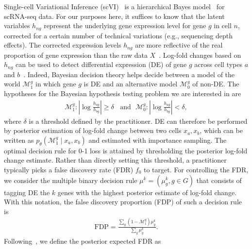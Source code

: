 Single-cell Variational Inference (scVI)~\cite{Lopez292037} is a hierarchical Bayes model~\cite{GelmanHill:2007} for scRNA-seq data. For our purposes here, it suffices to know that the latent variables $h_{ng}$ represent the underlying gene expression level for gene $g$ in cell $n$, corrected for a certain number of technical variations (e.g., sequencing depth effects). The corrected expression levels $h_{ng}$ are more reflective of the real proportion of gene expression than the raw data $X$~\cite{Cole2017}. Log-fold changes based on $h_{ng}$ can be used to detect differential expression (DE) of gene $g$ across cell types $a$ and $b$~\cite{deseq2,Boyeau794289}. Indeed, Bayesian decision theory helps decide between a model of the world $\mathcal{M}_1^g$ in which gene $g$ is DE and an alternative model $\mathcal{M}_0^g$ of non-DE. The hypotheses for the Bayesian hypothesis testing problem we are interested in are
\begin{align}
    \mathcal{M}^g_1: \left|\log\frac{h_{ag}}{h_{bg}}\right| \geq \delta ~~~~ \text{and}~~~ \mathcal{M}^g_0: \left|\log\frac{h_{ag}}{h_{bg}}\right| < \delta,
    \label{hypotheses}
\end{align}
where $\delta$ is a threshold defined by the practitioner. DE can therefore be performed by posterior estimation of log-fold change between two cells $x_a, x_b$, which can be written as
\(
p_\theta(\mathcal{M}^g_1 \mid x_a, x_b)
\)
and estimated with importance sampling.
The optimal decision rule for 0-1 loss is attained by thresholding the posterior log-fold change estimate.
Rather than directly setting this threshold, a practitioner typically picks a false discovery rate (FDR) $f_0$ to target. For controlling the FDR, 
we consider the multiple binary decision rule $\mu^k = (\mu_g^k, g \in G)$ that consists of tagging DE the $k$ genes with the highest posterior estimate of log-fold change.
With this notation, the false discovery proportion (FDP) of such a decision rule is
\begin{align}
    \mathrm{FDP} = 
        \frac
        {\sum_g (1 - \mathcal{M}_1^g) \mu_g^k}
        {\sum_g \mu_g^k}.
\end{align}
Following~\cite{Cui2015}, we define the posterior expected FDR as
